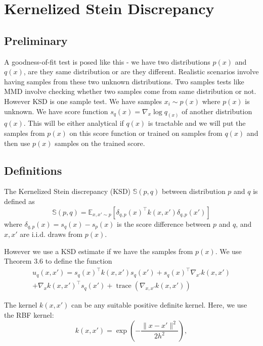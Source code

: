 \documentclass[12pt,a4paper]{report}
\begin{document}
\chapter{Kernelized Stein Discrepancy}
\section{Preliminary}
A goodness-of-fit test is posed like this - we have two distributions $p(x)$ and $q(x)$, are they same distribution or are they different. Realistic scenarios involve having samples from these two unknown distributions. Two samples tests like MMD involve checking whether two samples come from same distribution or not. However KSD is one sample test. We have samples  $x_i \sim p(x)$ where $p(x)$ is unknown. We have score function $s_q(x) = \nabla_{x} \log q_(x)$ of another distribution $q(x)$. This will be either analytical if $q(x)$ is tractable and we will put the samples from $p(x)$ on this score function or trained on samples from $q(x)$ and then use $p(x)$ samples on the trained score.

\section{Definitions}
The Kernelized Stein discrepancy (KSD) 
$\mathbb{S}(p,q)$ between distribution $p$ and $q$ is defined as
\begin{equation}
    \mathbb{S}(p,q)
    =
    \mathbb{E}_{x,x'\sim p}
    \left[
        \delta_{q,p}(x)^\top
        k(x,x')
        \delta_{q,p}(x')
    \right]
\end{equation}
\noindent
where $\delta_{q,p}(x) = s_q(x)-s_p(x)$ is the score difference between $p$ and $q$, and $x,x'$ are i.i.d. draws from $p(x)$.

\vspace{0.3cm}
\noindent
However we use a KSD estimate if we have the samples from $p(x)$. We use Theorem 3.6 \cite{liu2016kernelizedsteindiscrepancygoodnessoffit} to define the function
\begin{equation}
\begin{aligned}
u_q(x,x')
=
s_q(x)^\top k(x,x')s_q(x')
+ s_q(x)^\top \nabla_{x'} k(x,x') \\
+ \nabla_x k(x,x')^\top s_q(x')
+ \operatorname{trace}\left(\nabla_{x,x'} k(x,x')\right)
\end{aligned}
\label{eq:u_q}
\end{equation}

\noindent
The kernel $k({x},{x}')$ can be any suitable positive
definite kernel. Here, we use the RBF kernel:
\begin{equation}
k({x},{x}')
=
\exp\left(
-\frac{\|{x}-{x}'\|^2}
{2h^2}
\right),
\end{equation}
\end{document}
